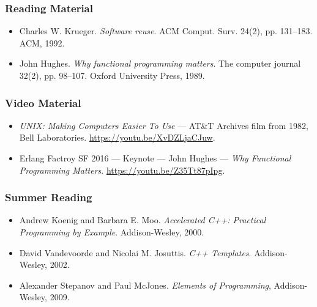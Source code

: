 \begin{frame}

\frametitle{Reading Material}

\footnotesize

\begin{itemize}

\item Charles W. Krueger. \emph{Software reuse}. ACM Comput. Surv. 24(2),
pp. 131--183. ACM, 1992.

\item John Hughes. \emph{Why functional programming matters}. The computer
journal 32(2), pp. 98--107. Oxford University Press, 1989.

\end{itemize}

\end{frame}


\begin{frame}

\frametitle{Video Material}

\footnotesize

\begin{itemize}

\item \emph{UNIX: Making Computers Easier To Use} --- AT\&T Archives film from
1982, Bell Laboratories. \url{https://youtu.be/XvDZLjaCJuw}.

\item Erlang Factroy SF 2016 --- Keynote --- John Hughes --- \emph{Why
Functional Programming Matters}. \url{https://youtu.be/Z35Tt87pIpg}.

\end{itemize}

\end{frame}


\begin{frame}

\frametitle{Summer Reading}

\footnotesize

\begin{itemize}

\item Andrew Koenig and Barbara E. Moo. \emph{Accelerated C++: Practical
Programming by Example}. Addison-Wesley, 2000.

\item David Vandevoorde and Nicolai M. Josuttis. \emph{C++ Templates}.
Addison-Wesley, 2002.

\item Alexander Stepanov and Paul McJones. \emph{Elements of Programming},
Addison-Wesley, 2009.

\end{itemize}

\end{frame}
